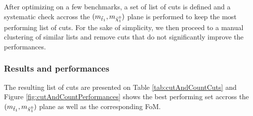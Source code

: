             After optimizing on a few benchmarks, a set of list of cuts is defined and a systematic check accross the
            $(m_{\tilde{t}_1},m_{\tilde{\chi}_1^0})$ plane is performed to keep the most performing list of cuts. For the
            sake of simplicity, we then proceed to a manual clustering of similar lists and remove cuts that do not 
            significantly improve the performances.

            \subsubsection{Results and performances}

            The resulting list of cuts are presented on Table \ref{tab:cutAndCountCuts} and Figure \ref{fig:cutAndCountPerformances}
            shows the best performing set accross the $(m_{\tilde{t}_1},m_{\tilde{\chi}_1^0})$ plane as well as the
            corresponding FoM.

